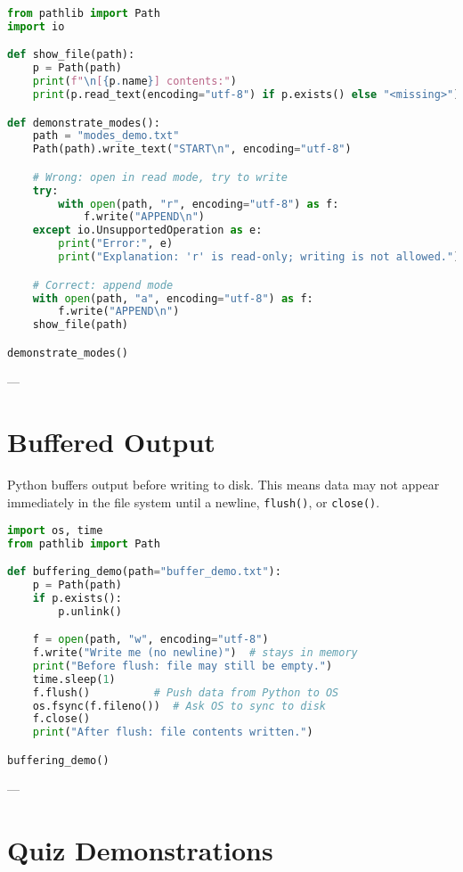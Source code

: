 \begin{lstlisting}[language=Python, caption={Example: Trying wrong modes, then fixing.}]
from pathlib import Path
import io

def show_file(path):
    p = Path(path)
    print(f"\n[{p.name}] contents:")
    print(p.read_text(encoding="utf-8") if p.exists() else "<missing>")

def demonstrate_modes():
    path = "modes_demo.txt"
    Path(path).write_text("START\n", encoding="utf-8")

    # Wrong: open in read mode, try to write
    try:
        with open(path, "r", encoding="utf-8") as f:
            f.write("APPEND\n")
    except io.UnsupportedOperation as e:
        print("Error:", e)
        print("Explanation: 'r' is read-only; writing is not allowed.")

    # Correct: append mode
    with open(path, "a", encoding="utf-8") as f:
        f.write("APPEND\n")
    show_file(path)

demonstrate_modes()
\end{lstlisting}

---

\section{Buffered Output}

Python buffers output before writing to disk.  
This means data may not appear immediately in the file system until a newline, \texttt{flush()}, or \texttt{close()}.

\begin{lstlisting}[language=Python, caption={Example: Forcing a buffer flush.}]
import os, time
from pathlib import Path

def buffering_demo(path="buffer_demo.txt"):
    p = Path(path)
    if p.exists():
        p.unlink()

    f = open(path, "w", encoding="utf-8")
    f.write("Write me (no newline)")  # stays in memory
    print("Before flush: file may still be empty.")
    time.sleep(1)
    f.flush()          # Push data from Python to OS
    os.fsync(f.fileno())  # Ask OS to sync to disk
    f.close()
    print("After flush: file contents written.")

buffering_demo()
\end{lstlisting}

---

\section{Quiz Demonstrations}

